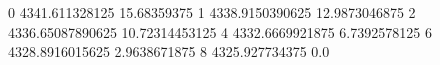 0 4341.611328125 15.68359375
1 4338.9150390625 12.9873046875
2 4336.65087890625 10.72314453125
4 4332.6669921875 6.7392578125
6 4328.8916015625 2.9638671875
8 4325.927734375 0.0
